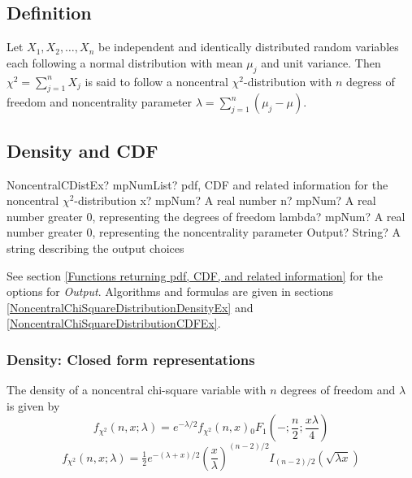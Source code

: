 \subsection{Definition}

\label{NoncentralChiSquareDistributionDefinitionEx}

Let $X_1, X_2, \ldots, X_n$ be independent and identically distributed random variables each following a normal distribution with mean $\mu_j$ and unit variance. 
Then $\chi^2 = \sum_{j=1}^n X_j$ is said to follow a noncentral $\chi^2$-distribution with $n$ degress of freedom and noncentrality parameter \mbox{$\lambda = \sum_{j=1}^n (\mu_j - \mu)$.} 




\subsection{Density and CDF}

\begin{mpFunctionsExtract}
	\mpFunctionFourNotImplemented
	{NoncentralCDistEx? mpNumList? pdf, CDF and related information for the noncentral $\chi^2$-distribution}
	{x? mpNum? A real number}
	{n? mpNum? A real number greater 0, representing the degrees of freedom}
	{lambda? mpNum? A real number greater 0, representing the noncentrality parameter}
	{Output? String? A string describing the output choices}
\end{mpFunctionsExtract}


\vspace{0.3cm}
See section \ref{Functions returning pdf, CDF, and related information} for the options for {\itshape\sffamily Output}. Algorithms and formulas are given in sections \ref{NoncentralChiSquareDistributionDensityEx} and \ref{NoncentralChiSquareDistributionCDFEx}.




\label{NoncentralChiSquareDistributionDensityEx}

\subsubsection{Density: Closed form representations}
The density of a noncentral chi-square variable with $n$ degrees of freedom  and $\lambda$ is given by  \citep{Wang1993}
\begin{equation}
	f_{\chi^2}\left(n, x; \lambda\right) =  e^{-\lambda/2} f_{\chi^2}(n, x)  {}_0F_1 \left(-; \frac{n}{2}; \frac{x \lambda}{4}\right)
\end{equation}
\begin{equation}
	f_{\chi^2}\left(n, x; \lambda\right) = \tfrac{1}{2} e^{-(\lambda+x)/2} \left( \frac{x}{\lambda}\right)^{(n-2)/2}  I_{(n-2)/2}\left(\sqrt{\lambda x}\right)
\end{equation}


